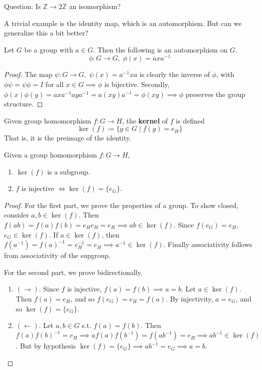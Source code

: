   Question: Is $\mathbb{Z} \rightarrow 2\mathbb{Z}$ an isomorphism? 

  A trivial example is the identity map, which is an automorphism. But can we generalize this a bit better? 

  \begin{theorem}
    Let $G$ be a group with $a \in G$. Then the following is an automorphism on $G$. 
    \begin{equation}
      \phi: G \longrightarrow G, \; \phi (x) = a x a^{-1}
    \end{equation}
  \end{theorem}
  \begin{proof}
    The map $\psi: G \longrightarrow G, \; \psi(x) = a^{-1} x a$ is clearly the inverse of $\phi$, with $\phi \psi = \psi \phi = I$ for all $x \in G \implies \phi$ is bijective. Secondly, $\phi(x) \phi(y) = a x a^{-1} a y a^{-1} = a (x y) a ^{-1} = \phi (x y) \implies \phi$ preserves the group structure. 
  \end{proof} 

  \begin{definition}[Kernel]
    Given group homomorphism $f: G \rightarrow H$, the \textbf{kernel} of $f$ is defined 
    \begin{equation}
      \ker(f) \coloneqq \{g \in G \mid f(g) = e_H\}
    \end{equation}
    That is, it is the preimage of the identity. 
  \end{definition} 

  \begin{theorem}
    Given a group homomorphism $f: G \rightarrow H$, 
    \begin{enumerate}
      \item $\ker(f)$ is a subgroup. 
      \item $f$ is injective $\iff \ker(f) = \{e_G\}$. 
    \end{enumerate}
  \end{theorem}
  \begin{proof}
    For the first part, we prove the properties of a group. To show closed, consider $a, b \in \ker(f)$. Then $f(ab) = f(a) f(b) = e_H e_H = e_H \implies ab \in \ker(f)$. Since $f(e_G) = e_H$, $e_G \in \ker(f)$. If $a \in \ker(f)$, then $f(a^{-1}) = f(a)^{-1} = e_H^{-1} = e_H \implies a^{-1} \in \ker(f)$. Finally associativity follows from associativity of the supgroup. 

    For the second part, we prove bidirectionally. 
    \begin{enumerate}
      \item $(\rightarrow)$. Since $f$ is injective, $f(a) = f(b) \implies a = b$. Let $a \in \ker(f)$. Then $f(a) = e_H$, and so $f(e_G) = e_H = f(a)$. By injectivity, $a = e_G$, and so $\ker(f) = \{e_G\}$. 
      \item $(\leftarrow)$. Let $a, b \in G$ s.t. $f(a) = f(b)$. Then $f(a) f(b)^{-1} = e_H \implies af(a) f(b^{-1}) = f(a b^{-1}) = e_H \implies ab^{-1} \in \ker(f)$. But by hypothesis $\ker(f) = \{e_G\} \implies ab^{-1} = e_G \implies a = b$. 
    \end{enumerate}
  \end{proof}

